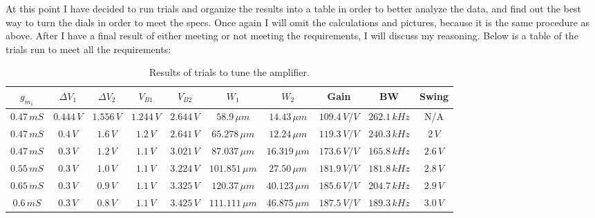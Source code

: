 \documentclass[12pt, fleqn]{article}
\begin{document}
At this point I have decided to run trials and organize the results into a table in order to better analyze the data, and find out the best way to turn the dials in order to meet the specs.  Once again I will omit the calculations and pictures, because it is the same procedure as above.  After I have a final result of either meeting or not meeting the requirements, I will discuss my reasoning.  Below is a table of the trials run to meet all the requirements:
\begin{table}[H]
\centering
\setlength{\tabcolsep}{4pt}
\renewcommand{\arraystretch}{1.25}
\begin{tabular}{|c|c|c|c|c|c|c|c|c|c|}
    \hline
    $g_{m_1}$ & $\Delta V_1$ & $\Delta V_2$ & $V_{B1}$ & $V_{B2}$ & $W_1$ & $W_2$ & Gain & BW & Swing\\
    \hline
    $0.47\,mS$ & $0.444\,V$ & $1.556\,V$ & $1.244\,V$ & $2.644\,V$ & $58.9\,\mu m$ & $14.43\,\mu m$ & $109.4\,V/V$ & $262.1\,kHz$ & N/A\\
    \hline
    $0.47\,mS$ & $0.4\,V$ & $1.6\,V$ & $1.2\,V$ & $2.641\,V$ & $65.278\,\mu m$ & $12.24\,\mu m$ & $119.3\,V/V$ & $240.3\,kHz$ & $2\,V$\\
    \hline
    $0.47\,mS$ & $0.3\,V$ & $1.2\,V$ & $1.1\,V$ & $3.021\,V$ & $87.037\,\mu m$ & $16.319\,\mu m$ & $173.6\,V/V$ & $165.8\,kHz$ & $2.6\,V$\\
    \hline
    $0.55\,mS$ & $0.3\,V$ & $1.0\,V$ & $1.1\,V$ & $3.224\,V$ & $101.851\,\mu m$ & $27.50\,\mu m$ & $181.9\,V/V$ & $181.8\,kHz$ & $2.8\,V$\\
    \hline
    $0.65\,mS$ & $0.3\,V$ & $0.9\,V$ & $1.1\,V$ & $3.325\,V$ & $120.37\,\mu m$ & $40.123\,\mu m$ & $185.6\,V/V$ & $204.7\,kHz$ & $2.9\,V$\\
    \hline
    $0.6\,mS$ & $0.3\,V$ & $0.8\,V$ & $1.1\,V$ & $3.425\,V$ & $111.111\,\mu m$ & $46.875\,\mu m$ & $187.5\,V/V$ & $189.3\,kHz$ & $3.0\,V$\\
    \hline
\end{tabular}
\caption{Results of trials to tune the amplifier.}
\end{table}
\end{document}
